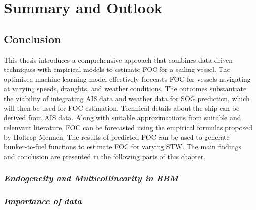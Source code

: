 \chapter{Summary and Outlook} \label{chp:outlook}

\section{Conclusion}\label{sec:conclusion}

This thesis introduces a comprehensive approach that combines data-driven techniques with empirical models to estimate FOC for a sailing vessel. The optimised machine learning model effectively forecasts FOC for vessels navigating at varying speeds, draughts, and weather conditions. The outcomes substantiate the viability of integrating AIS data and weather data for SOG prediction, which will then be used for FOC estimation. Technical details about the ship can be derived from AIS data. Along with suitable approximatiions from suitable and relenvant literature, FOC can be forecasted using the empirical formulas proposed by Holtrop-Mennen. The results of predicted FOC can be used to generate bunker-to-fuel functions to estimate FOC for varying STW. The main findings and conclusion are presented in the following parts of this chapter.\\

\subsection*{\emph{Endogeneity and Multicollinearity in BBM}}



\subsection*{\emph{Importance of data}}

